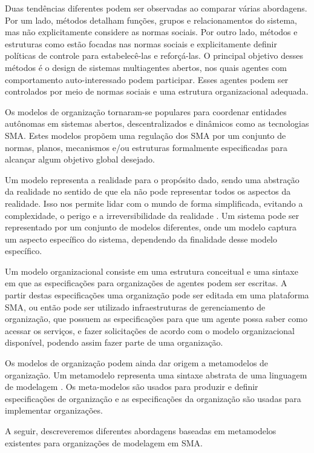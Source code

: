\documentclass[dm,ppgcomp]{texfurg} %
\begin{document}
Duas tendências diferentes podem ser observadas ao comparar várias abordagens. Por um lado, métodos detalham funções, grupos e relacionamentos do sistema, mas não explicitamente considere as normas sociais. Por outro lado, métodos e estruturas como estão focadas nas normas sociais e explicitamente definir políticas de controle para estabelecê-las e reforçá-las. O principal objetivo desses métodos é o design de sistemas multiagentes abertos, nos quais agentes com comportamento auto-interessado podem participar. Esses agentes podem ser controlados por meio de normas sociais e uma estrutura organizacional adequada\cite{argente2006multi}.

Os modelos de organização tornaram-se populares para coordenar entidades autônomas em sistemas abertos, descentralizados e dinâmicos como as tecnologias SMA. Estes modelos propõem uma regulação dos SMA por um conjunto de normas, planos, mecanismos e/ou estruturas formalmente especificadas para alcançar algum objetivo global desejado.

Um modelo representa a realidade para o propósito dado, sendo uma abstração da realidade no sentido de que ela não pode representar todos os aspectos da realidade. Isso nos permite lidar com o mundo de forma simplificada, evitando a complexidade, o perigo e a irreversibilidade da realidade \cite{rothenberg1989nature}. Um sistema pode ser representado por um conjunto de modelos diferentes, onde um modelo captura um aspecto específico do sistema, dependendo da finalidade desse modelo específico.

Um modelo organizacional consiste em uma estrutura conceitual e uma sintaxe em que as especificações para organizações de agentes podem ser escritas. A partir destas especificações uma organização pode ser editada em uma plataforma SMA, ou então pode ser utilizado infraestruturas de gerenciamento de organização, que possuem as especificações para que um agente possa saber como acessar os serviços, e fazer solicitações de acordo com o modelo organizacional disponível, podendo assim fazer parte de uma organização.

Os modelos de organização podem ainda dar origem a metamodelos de organização. Um metamodelo representa uma sintaxe abstrata de uma linguagem de modelagem \cite{steinberg2008emf}. Os meta-modelos são usados para produzir e definir especificações de organização e as especificações da organização são usadas para implementar organizações.

A seguir, descreveremos diferentes abordagens baseadas em metamodelos existentes para organizações de modelagem em SMA.
\end{document}
